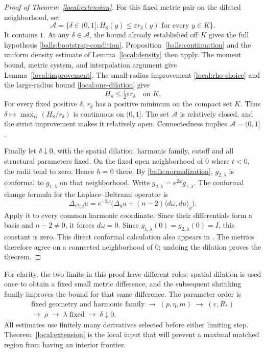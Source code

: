 \begin{proof}[Proof of Theorem~\ref{local:extension}]
For this fixed metric pair on the dilated neighborhood, set
\[
 \mathcal A=\{\delta\in(0,1]:
        H_8(y)\leq\varepsilon r_\delta(y)\text{ for every }y\in K\}.
\]
It contains $1$.  At any $\delta\in\mathcal A$, the bound already
established off $K$ gives the full hypothesis
\eqref{balls:bootstrap-condition}.  Proposition~\ref{balls:continuation}
and the uniform density estimate of Lemma~\ref{local:density} then apply.
The moment bound, metric system, and interpolation argument give
Lemma~\ref{local:improvement}.
The small-radius improvement \eqref{local:rho-choice} and the
large-radius bound \eqref{local:one-dilation} give
\[
 H_8\leq\tfrac12\varepsilon r_\delta\quad\text{on }K.
\]
For every fixed positive $\delta$, $r_\delta$ has a positive minimum
on the compact set $K$.  Thus
$\delta\mapsto\max_K(H_8/r_\delta)$ is continuous on $(0,1]$.
The set $\mathcal A$ is relatively closed, and the strict improvement
makes it relatively open.  Connectedness implies
$\mathcal A=(0,1]$.

Finally let $\delta\downarrow0$, with the spatial dilation, harmonic
family, cutoff and all structural parameters fixed.  On the fixed
open neighborhood of $0$ where $t<0$, the radii tend to zero.  Hence
$h=0$ there.  By \eqref{balls:normalization}, $g_{2,\lambda}$ is
conformal to $g_{1,\lambda}$ on that neighborhood.  Write
$g_{2,\lambda}=e^{2\omega}g_{1,\lambda}$.  The conformal change formula
for the Laplace--Beltrami operator is
\[
 \Delta_{e^{2\omega}g}u
  =e^{-2\omega}\bigl(\Delta_g u
                 +(n-2)\langle d\omega,du\rangle_g\bigr).
\]
Apply it to every common harmonic coordinate.  Since their
differentials form a basis and $n-2\ne0$, it forces $d\omega=0$.
Since $g_{1,\lambda}(0)=g_{2,\lambda}(0)=I$, this constant is zero.
This direct conformal calculation also appears in
\citep[Proposition~4.1]{LLS20}.
The metrics therefore agree on a connected neighborhood of $0$;
undoing the dilation proves the theorem.
\end{proof}

For clarity, the two limits in this proof have different roles:
spatial dilation is used once to obtain a fixed small metric
difference, and the subsequent shrinking family improves the bound
for that same difference.  The parameter order is
\begin{equation}\label{local:parameter-order}
 \begin{gathered}
 \text{fixed geometry and harmonic family}
   \;\longrightarrow\;(p,\eta,m)
   \;\longrightarrow\;(\varepsilon,R_*)\\
 \longrightarrow\;\rho\;\longrightarrow\;
 \lambda\text{ fixed}\;\longrightarrow\;\delta\downarrow0.
 \end{gathered}
\end{equation}
All estimates use finitely many derivatives selected before either
limiting step.  Theorem~\ref{local:extension} is the local input that
will prevent a maximal matched region from having an interior
frontier.
